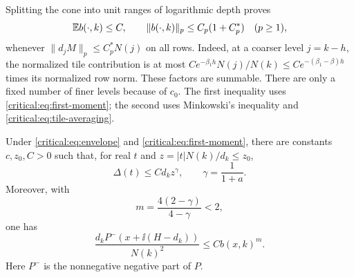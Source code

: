 Splitting the cone into unit ranges of logarithmic depth proves
\begin{equation}\label{critical:eq:cone-moments}
 \mathbb E b(\cdot,k)\le C,
 \qquad
 \|b(\cdot,k)\|_p\le C_p(1+C_p^*)\quad(p\ge1),
\end{equation}
whenever \(\|d_jM\|_p\le C_p^*N(j)\) on all rows. Indeed, at a
coarser level \(j=k-h\), the normalized tile contribution is at most
\(C e^{-\beta_1h}N(j)/N(k)\le C e^{-(\beta_1-\beta)h}\)
times its normalized row norm. These factors are summable. There are
only a fixed number of finer levels because of \(c_0\). The
first inequality uses \eqref{critical:eq:first-moment}; the second
uses Minkowski's inequality and \eqref{critical:eq:tile-averaging}.

\begin{lemma}\label{critical:lem:one-sided}
Under \eqref{critical:eq:envelope} and
\eqref{critical:eq:first-moment}, there are constants \(c,z_0,C>0\)
such that, for real \(t\) and
\(z=|t|N(k)/d_k\le z_0\),
\begin{equation}\label{critical:eq:real-deficit}
 \Delta(t)\le C d_kz^\gamma,
 \qquad \gamma=\frac1{1+a}.
\end{equation}
Moreover, with
\begin{equation}\label{critical:eq:m-exponent}
 m=\frac{4(2-\gamma)}{4-\gamma}<2,
\end{equation}
one has
\begin{equation}\label{critical:eq:negative-P}
 \frac{d_kP^-(x+\ii(H-d_k))}{N(k)^2}
 \le C b(x,k)^m.
\end{equation}
Here \(P^-\) is the nonnegative negative part of \(P\).
\end{lemma}

